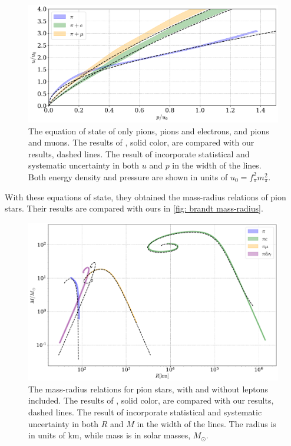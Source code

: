 \begin{figure}[!htb]
    \centering
    \includegraphics[width=\textwidth]{../scripts/figurer/brandt_eos.pdf}
    \caption{
        The equation of state of only pions, pions and electrons, and pions and muons.
        The results of \citeauthor{brandtNewClassCompact2018}, solid color, are compared with our results, dashed lines.
        The result of \citeauthor{brandtNewClassCompact2018} incorporate statistical and systematic uncertainty in both $u$ and $p$ in the width of the lines.
        Both energy density and pressure are shown in units of $u_0 = f_\pi^2 m_\pi^2$.
    }
    \label{fig: brandt eos}
\end{figure}


With these equations of state, they obtained the mass-radius relations of pion stars.
Their results are compared with ours in  \autoref{fig: brandt mass-radius}.


\begin{figure}[!htb]
    \centering
    \includegraphics[width=\textwidth]{../scripts/figurer/pion_star/mass_radius_brandt_all.pdf}
    \caption{
        The mass-radius relations for pion stars, with and without leptons included.
        The results of \citeauthor{brandtNewClassCompact2018}, solid color, are compared with our results, dashed lines.
        The result of \citeauthor{brandtNewClassCompact2018} incorporate statistical and systematic uncertainty in both $R$ and $M$ in the width of the lines.
        The radius is in units of $\text{km}$, while mass is in solar masses, $M_\odot$.
    }
    \label{fig: brandt mass-radius}
\end{figure}


